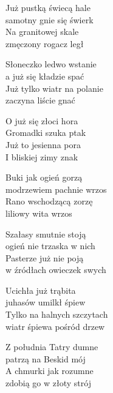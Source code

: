 \begin{text}
    Już pustką świecą hale\\
    samotny gnie się świerk\\
    Na granitowej skale\\
    zmęczony rogacz legł

    Słoneczko ledwo wstanie\\
    a już się kładzie spać\\
    Już tylko wiatr na polanie\\
    zaczyna liście gnać

    \vin O już się złoci hora\\
    \vin Gromadki szuka ptak\\
    \vin Już to jesienna pora\\
    \vin I bliskiej zimy znak

    Buki jak ogień gorzą\\
    modrzewiem pachnie wrzos\\
    Rano wschodzącą zorzę\\
    liliowy wita wrzos

    Szałasy smutnie stoją\\
    ogień nie trzaska w nich\\
    Pasterze już nie poją\\
    w źródłach owieczek swych

    Ucichła już trąbita\\
    juhasów umilkł śpiew\\
    Tylko na halnych szczytach\\
    wiatr śpiewa pośród drzew

    Z południa Tatry dumne\\
    patrzą na Beskid mój\\
    A chmurki jak rozumne\\
    zdobią go w złoty strój
\end{text}
